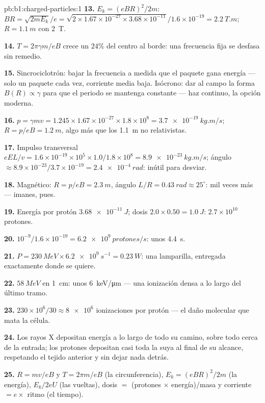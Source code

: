 \begin{solution}{pb:b1:charged-particles:1}
\textbf{13.} $E_k = (eBR)^2/2m$: $BR = \sqrt{2mE_k}/e = \sqrt{2 \times 1.67\times
10^{-27} \times 3.68\times10^{-11}}/1.6\times10^{-19} = \qty{2.2}{T.m}$; $R =
\qty{1.1}{m}$ con \qty{2}{T}.

\textbf{14.} $T = 2\pi\gamma m/eB$ crece un $24\%$ del centro al borde: una
frecuencia fija se desfasa sin remedio.

\textbf{15.} Sincrociclotrón: bajar la frecuencia a medida que el paquete
gana energía --- solo un paquete cada vez, corriente media baja.
Isócrono: dar al campo la forma $B(R) \propto \gamma$ para que el periodo
se mantenga constante --- haz continuo, la opción moderna.

\textbf{16.} $p = \gamma mv = 1.245 \times 1.67\times10^{-27} \times 1.8\times10^8
= \qty{3.7e-19}{kg.m/s}$; $R = p/eB = \qty{1.2}{m}$, algo más que los
\qty{1.1}{m} no relativistas.

\textbf{17.} Impulso transversal $eEL/v = 1.6\times10^{-19} \times 10^5 \times
1.0/1.8\times10^8 = \qty{8.9e-23}{kg.m/s}$; ángulo $\approx 8.9\times10^{-23}/
3.7\times10^{-19} = \qty{2.4e-4}{rad}$: inútil para desviar.

\textbf{18.} Magnético: $R = p/eB = \qty{2.3}{m}$, ángulo $L/R = \qty{0.43}{rad}
\approx 25^\circ$: mil veces más --- imanes, pues.

\textbf{19.} Energía por protón $\qty{3.68e-11}{J}$; dosis $2.0 \times 0.50 =
\qty{1.0}{J}$: $2.7\times10^{10}$ protones.

\textbf{20.} $10^{-9}/1.6\times10^{-19} = \qty{6.2e9}{protones/s}$: unos
\qty{4.4}{s}.

\textbf{21.} $P = \qty{230}{MeV} \times \qty{6.2e9}{s^{-1}} = \qty{0.23}{W}$:
una lamparilla, entregada exactamente donde se quiere.

\textbf{22.} $\qty{58}{MeV}$ en \qty{1}{cm}: unos \qty{6}{keV/\micro m} ---
una ionización densa a lo largo del último tramo.

\textbf{23.} $230\times10^6/30 \approx \num{8e6}$ ionizaciones por protón ---
el daño molecular que mata la célula.

\textbf{24.} Los rayos X depositan energía a lo largo de todo su camino,
sobre todo cerca de la entrada; los protones depositan casi toda la suya
al final de su alcance, respetando el tejido anterior y sin dejar nada detrás.

\textbf{25.} $R = mv/eB$ y $T = 2\pi m/eB$ (la circunferencia), $E_k = (eBR)^2/2m$
(la energía), $E_k/2eU$ (las vueltas), dosis $=$ (protones $\times$ energía)/masa
y corriente $= e \times$ ritmo (el tiempo).
\end{solution}
